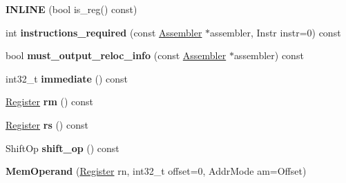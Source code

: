 \begin{DoxyCompactItemize}
\item 
{\bfseries I\+N\+L\+I\+NE} (bool is\+\_\+reg() const)\hypertarget{classv8_1_1internal_1_1_b_a_s_e___e_m_b_e_d_d_e_d_af96ed83955e2626794405e249b11dabd}{}\label{classv8_1_1internal_1_1_b_a_s_e___e_m_b_e_d_d_e_d_af96ed83955e2626794405e249b11dabd}

\item 
int {\bfseries instructions\+\_\+required} (const \hyperlink{classv8_1_1internal_1_1_assembler}{Assembler} $\ast$assembler, Instr instr=0) const \hypertarget{classv8_1_1internal_1_1_b_a_s_e___e_m_b_e_d_d_e_d_adfcd2b0f792ba2e3b969c3d64ba399fe}{}\label{classv8_1_1internal_1_1_b_a_s_e___e_m_b_e_d_d_e_d_adfcd2b0f792ba2e3b969c3d64ba399fe}

\item 
bool {\bfseries must\+\_\+output\+\_\+reloc\+\_\+info} (const \hyperlink{classv8_1_1internal_1_1_assembler}{Assembler} $\ast$assembler) const \hypertarget{classv8_1_1internal_1_1_b_a_s_e___e_m_b_e_d_d_e_d_a7de2cb63e5bc60d5444fef0f05f51808}{}\label{classv8_1_1internal_1_1_b_a_s_e___e_m_b_e_d_d_e_d_a7de2cb63e5bc60d5444fef0f05f51808}

\item 
int32\+\_\+t {\bfseries immediate} () const \hypertarget{classv8_1_1internal_1_1_b_a_s_e___e_m_b_e_d_d_e_d_a888588d3c6e6470287383ecbe056c15d}{}\label{classv8_1_1internal_1_1_b_a_s_e___e_m_b_e_d_d_e_d_a888588d3c6e6470287383ecbe056c15d}

\item 
\hyperlink{structv8_1_1internal_1_1_register}{Register} {\bfseries rm} () const \hypertarget{classv8_1_1internal_1_1_b_a_s_e___e_m_b_e_d_d_e_d_a3b52dc72ba96afd1a2469b5e3e490851}{}\label{classv8_1_1internal_1_1_b_a_s_e___e_m_b_e_d_d_e_d_a3b52dc72ba96afd1a2469b5e3e490851}

\item 
\hyperlink{structv8_1_1internal_1_1_register}{Register} {\bfseries rs} () const \hypertarget{classv8_1_1internal_1_1_b_a_s_e___e_m_b_e_d_d_e_d_aa3e3f73b31fef31005d1c3aa92196cbf}{}\label{classv8_1_1internal_1_1_b_a_s_e___e_m_b_e_d_d_e_d_aa3e3f73b31fef31005d1c3aa92196cbf}

\item 
Shift\+Op {\bfseries shift\+\_\+op} () const \hypertarget{classv8_1_1internal_1_1_b_a_s_e___e_m_b_e_d_d_e_d_afd61af28d74d1a8f8b669e5188526071}{}\label{classv8_1_1internal_1_1_b_a_s_e___e_m_b_e_d_d_e_d_afd61af28d74d1a8f8b669e5188526071}

\item 
{\bfseries Mem\+Operand} (\hyperlink{structv8_1_1internal_1_1_register}{Register} rn, int32\+\_\+t offset=0, Addr\+Mode am=Offset)\hypertarget{classv8_1_1internal_1_1_b_a_s_e___e_m_b_e_d_d_e_d_ab84169d8506387baa0d4b6c7fd6eb7a9}{}\label{classv8_1_1internal_1_1_b_a_s_e___e_m_b_e_d_d_e_d_ab84169d8506387baa0d4b6c7fd6eb7a9}


\end{DoxyCompactItemize}
